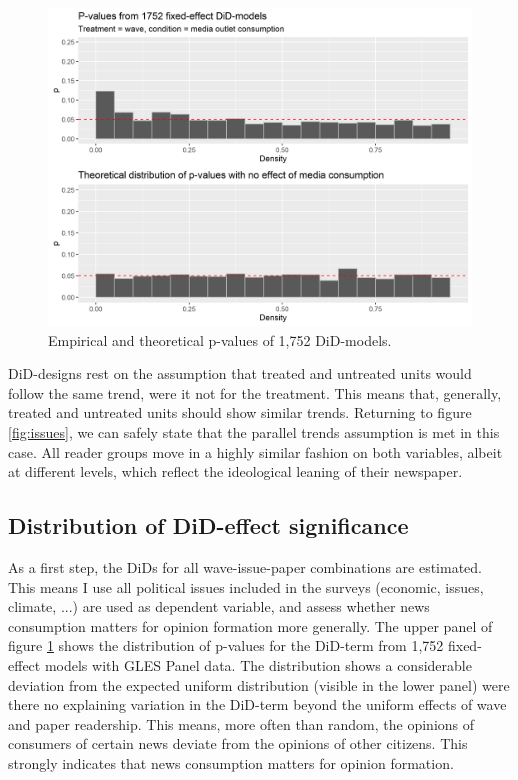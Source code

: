 \documentclass{article}
\begin{document}
\begin{figure}[!ht]
    \centering
    \includegraphics[width=\textwidth]{paper/vis/DiD_model_ps.png}
    \caption{Empirical and theoretical p-values of 1,752 DiD-models.}
    \label{fig:p_values}
\end{figure}

DiD-designs rest on the assumption that treated and untreated units would follow the same trend, were it not for the treatment. This means that, generally, treated and untreated units should show similar trends. Returning to figure \ref{fig:issues}, we can safely state that the parallel trends assumption is met in this case. All reader groups move in a highly similar fashion on both variables, albeit at different levels, which reflect the ideological leaning of their newspaper.

\subsection{Distribution of DiD-effect significance}

As a first step, the DiDs for all wave-issue-paper combinations are estimated. This means I use all political issues included in the surveys (economic, issues, climate, ...) are used as dependent variable, and assess whether news consumption matters for opinion formation more generally. The upper panel of figure \ref{fig:p_values} shows the distribution of p-values for the DiD-term from 1,752 fixed-effect models with GLES Panel data. The distribution shows a considerable deviation from the expected uniform distribution (visible in the lower panel) were there no explaining variation in the DiD-term beyond the uniform effects of wave and paper readership. This means, more often than random, the opinions of consumers of certain news deviate from the opinions of other citizens. This strongly indicates that news consumption matters for opinion formation.
\end{document}
